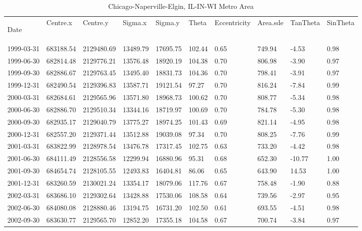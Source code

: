 \begin{landscape}
\singlespacing
\small
\centering
\begin{longtable}{llllllllll}
\caption{Chicago-Naperville-Elgin, IL-IN-WI Metro Area} 
\endfirsthead
\caption{Chicago-Naperville-Elgin, IL-IN-WI Metro Area} 
\endhead
\label{tab:Chi_SE} 

Date       & Centre.x   & Centre.y   & Sigma.x  & Sigma.y  & Theta  & Eccentricity & Area.sde & TanTheta & SinTheta \\
1999-03-31 & 683188.54 & 2129480.69 & 13489.79 & 17695.75 & 102.44 & 0.65 & 749.94  & -4.53  & 0.98 \\
1999-06-30 & 682814.48 & 2129776.21 & 13576.48 & 18920.19 & 104.38 & 0.70 & 806.98  & -3.90  & 0.97 \\
1999-09-30 & 682886.67 & 2129763.45 & 13495.40 & 18831.73 & 104.36 & 0.70 & 798.41  & -3.91  & 0.97 \\
1999-12-31 & 682490.54 & 2129396.83 & 13587.71 & 19121.54 & 97.27  & 0.70 & 816.24  & -7.84  & 0.99 \\
2000-03-31 & 682684.61 & 2129565.96 & 13571.80 & 18968.73 & 100.62 & 0.70 & 808.77  & -5.34  & 0.98 \\
2000-06-30 & 682886.70 & 2129510.34 & 13344.16 & 18719.97 & 100.69 & 0.70 & 784.78  & -5.30  & 0.98 \\
2000-09-30 & 682935.17 & 2129040.79 & 13775.27 & 18974.25 & 101.43 & 0.69 & 821.14  & -4.95  & 0.98 \\
2000-12-31 & 682557.20 & 2129371.44 & 13512.88 & 19039.08 & 97.34  & 0.70 & 808.25  & -7.76  & 0.99 \\
2001-03-31 & 683822.99 & 2128978.54 & 13476.78 & 17317.45 & 102.75 & 0.63 & 733.20  & -4.42  & 0.98 \\
2001-06-30 & 684111.49 & 2128556.58 & 12299.94 & 16880.96 & 95.31  & 0.68 & 652.30  & -10.77 & 1.00 \\
2001-09-30 & 684654.74 & 2128105.55 & 12493.83 & 16404.81 & 86.06  & 0.65 & 643.90  & 14.53  & 1.00 \\
2001-12-31 & 683260.59 & 2130021.24 & 13354.17 & 18079.06 & 117.76 & 0.67 & 758.48  & -1.90  & 0.88 \\
2002-03-31 & 683686.10 & 2129302.64 & 13428.88 & 17530.06 & 108.58 & 0.64 & 739.56  & -2.97  & 0.95 \\
2002-06-30 & 684080.08 & 2128880.46 & 13194.75 & 16731.20 & 102.50 & 0.61 & 693.55  & -4.51  & 0.98 \\
2002-09-30 & 683630.77 & 2129565.70 & 12852.20 & 17355.18 & 104.58 & 0.67 & 700.74  & -3.84  & 0.97 \\

\end{longtable}
\end{landscape}
